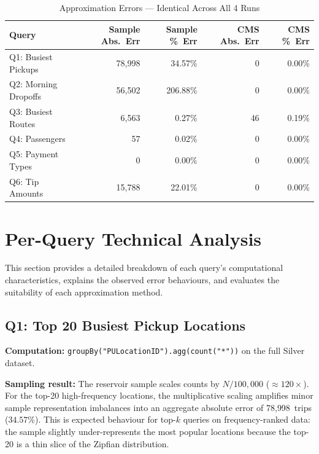 \documentclass{article}
\begin{document}
\begin{table}[H]
\centering
\caption{Approximation Errors — Identical Across All 4 Runs}
\label{tab:errors_stable}
\begin{tabular}{l r r r r}
\toprule
\textbf{Query} & \textbf{Sample Abs.\ Err} & \textbf{Sample \%\ Err} & \textbf{CMS Abs.\ Err} & \textbf{CMS \%\ Err} \\
\midrule
Q1: Busiest Pickups  & 78{,}998 & 34.57\% & 0   & 0.00\% \\
Q2: Morning Dropoffs & 56{,}502 & 206.88\% & 0   & 0.00\% \\
Q3: Busiest Routes   & 6{,}563  & 0.27\%  & 46  & 0.19\% \\
Q4: Passengers       & 57       & 0.02\%  & 0   & 0.00\% \\
Q5: Payment Types    & 0        & 0.00\%  & 0   & 0.00\% \\
Q6: Tip Amounts      & 15{,}788 & 22.01\% & 0   & 0.00\% \\
\bottomrule
\end{tabular}
\end{table}



\section{Per-Query Technical Analysis}

This section provides a detailed breakdown of each query's computational characteristics, explains the observed error behaviours, and evaluates the suitability of each approximation method.

\subsection{Q1: Top 20 Busiest Pickup Locations}

\textbf{Computation:} \texttt{groupBy("PULocationID").agg(count("*"))} on the full Silver dataset.

\textbf{Sampling result:} The reservoir sample scales counts by $N / 100{,}000$ ($\approx 120\times$). For the top-20 high-frequency locations, the multiplicative scaling amplifies minor sample representation imbalances into an aggregate absolute error of 78{,}998~trips ($34.57\%$). This is expected behaviour for top-$k$ queries on frequency-ranked data: the sample slightly under-represents the most popular locations because the top-20 is a thin slice of the Zipfian distribution.
\end{document}
